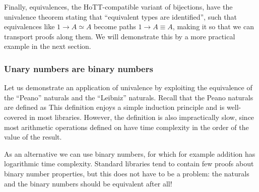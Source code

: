 Finally, equivalences, the HoTT-compatible variant of bijections, have the univalence theorem 
stating that ``equivalent types are identified'', such that equivalences like $1 \to A \simeq A$ become paths $1 \to A \equiv A$, making it so that we can transport proofs along them. We will demonstrate this by a more practical example in the next section.

\subsubsection{Unary numbers are binary numbers}\label{ssec:binary}
Let us demonstrate an application of univalence by exploiting the equivalence of the ``Peano'' naturals and the ``Leibniz'' naturals. Recall that the Peano naturals are defined as 
This definition enjoys a simple induction principle and is well-covered in most libraries. However, the definition is also impractically slow, since most arithmetic operations defined on \bN{} have time complexity in the order of the value of the result.

As an alternative we can use binary numbers, for which for example addition has logarithmic time complexity. Standard libraries tend to contain few proofs about binary number properties, but this does not have to be a problem: the \bN{} naturals and the binary numbers should be equivalent after all!

